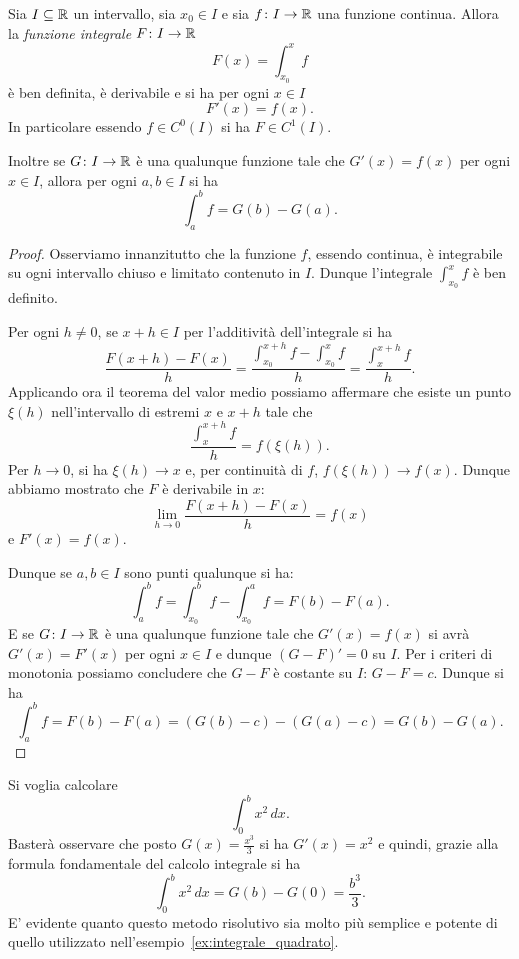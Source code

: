 \begin{theorem}
\mymark{***}%
%
%
%
\label{th:torricelli-barrow}%
Sia $I\subseteq {\mathbb R}$ un intervallo, sia $x_0 \in I$
 e sia $f\colon I\to {\mathbb R}$ una funzione continua.
Allora la \emph{funzione integrale}
$F\colon I \to {\mathbb R}$
\[
  F(x) = \int_{x_0}^x f
\]
è ben definita, è derivabile e si ha per ogni $x\in I$
\[
  F'(x) = f(x).
\]
In particolare essendo $f\in C^0(I)$ si ha $F\in C^1(I)$.

Inoltre se $G\colon I \to {\mathbb R}$ è una qualunque funzione tale che
$G'(x) = f(x)$ per ogni $x\in I$, allora per ogni $a,b \in I$ si ha
%
\[
  \int_a^b f = G(b) - G(a).
\]
\end{theorem}
%
\begin{proof}
\mymark{***}
Osserviamo innanzitutto che la funzione $f$, essendo continua, è integrabile
su ogni intervallo chiuso e limitato contenuto in $I$. Dunque l'integrale
$\int_{x_0}^x f$ è ben definito.

Per ogni $h\neq 0$, se $x+h \in I$ per l'additività dell'integrale
si ha
\[
\frac{F(x+h) - F(x)}{h} = \frac{\int_{x_0}^{x+h} f - \int_{x_0}^x f}{h}
 = \frac{\int_x^{x+h} f}{h}.
\]
Applicando ora il teorema del valor medio possiamo
affermare che esiste un punto $\xi(h)$ nell'intervallo di estremi $x$ e $x+h$
tale che
\[
  \frac{\int_x^{x+h} f}{h} = f(\xi(h)).
\]
Per $h\to 0$, si ha $\xi(h) \to x$ e, per continuità di $f$,
$f(\xi(h)) \to f(x)$.
Dunque abbiamo mostrato che $F$ è derivabile in $x$:
\[
 \lim_{h\to 0}\frac{F(x+h)-F(x)}{h} = f(x)
\]
e $F'(x) = f(x)$.

Dunque se $a,b\in I$ sono punti qualunque si ha:
\[
\int_a^b f = \int_{x_0}^b f - \int_{x_0}^a f = F(b) - F(a).
\]
E se $G\colon I \to {\mathbb R}$ è una qualunque  funzione tale che $G'(x)=f(x)$ si
avrà $G'(x) = F'(x)$ per ogni $x\in I$ e dunque $(G-F)' = 0$ su $I$.
Per i criteri di monotonia possiamo concludere che $G-F$ è costante su $I$:
$G-F = c$. Dunque si ha
\[
 \int_a^b f = F(b) - F(a) = (G(b) - c) - (G(a) - c) = G(b) - G(a).
\]
\end{proof}

\begin{example}
Si voglia calcolare
\[
  \int_0^b x^2\, dx.
\]
Basterà osservare che posto $G(x)=\frac{x^3}{3}$ si ha $G'(x)=x^2$
e quindi, grazie alla formula fondamentale del calcolo integrale si
ha
\[
  \int_0^b x^2\, dx = G(b) - G(0) = \frac{b^3}{3}.
\]
E' evidente quanto questo metodo risolutivo sia molto più semplice
e potente di quello utilizzato nell'esempio~\ref{ex:integrale_quadrato}.
\end{example}

